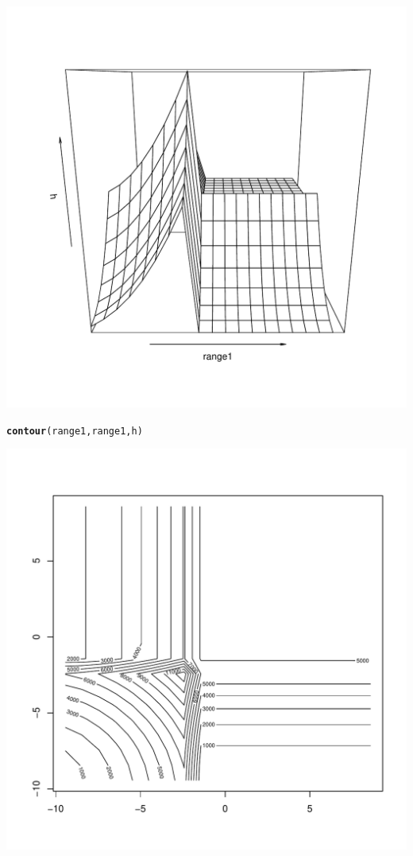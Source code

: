 \documentclass{article}\usepackage[]{graphicx}\usepackage[]{color}
\makeatletter
\def\maxwidth{ %
  \ifdim\Gin@nat@width>\linewidth
    \linewidth
  \else
    \Gin@nat@width
  \fi
}
\newcommand{\hlstd}[1]{\textcolor[rgb]{0.345,0.345,0.345}{#1}}%
\newcommand{\hlkwd}[1]{\textcolor[rgb]{0.737,0.353,0.396}{\textbf{#1}}}%
\newenvironment{kframe}{%
 \def\at@end@of@kframe{}%
 \ifinner\ifhmode%
  \def\at@end@of@kframe{\end{minipage}}%
  \begin{minipage}{\columnwidth}%
 \fi\fi%
 \def\FrameCommand##1{\hskip\@totalleftmargin \hskip-\fboxsep
 \colorbox{shadecolor}{##1}\hskip-\fboxsep
     \hskip-\linewidth \hskip-\@totalleftmargin \hskip\columnwidth}%
 \MakeFramed {\advance\hsize-\width
   \@totalleftmargin\z@ \linewidth\hsize
   \@setminipage}}%
 {\par\unskip\endMakeFramed%
 \at@end@of@kframe}
\newenvironment{knitrout}{}{} %
\makeatother
\begin{document}
\begin{knitrout}
\begin{kframe}
\begin{alltt}
\end{alltt}
\end{kframe}
\includegraphics[width=\maxwidth]{figure/unnamed-chunk-4-2} 
\begin{kframe}\begin{alltt}
\hlkwd{contour}\hlstd{(range1,range1,h)}
\end{alltt}
\end{kframe}
\includegraphics[width=\maxwidth]{figure/unnamed-chunk-4-3} 

\end{knitrout}
\end{document}
